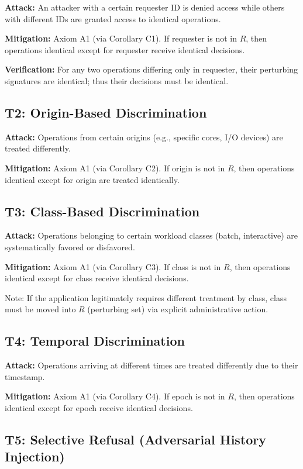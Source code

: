 \documentclass[11pt,oneside]{article}
\begin{document}
\textbf{Attack:} An attacker with a certain requester ID is denied access while others with different IDs are granted access to identical operations.

\textbf{Mitigation:} Axiom A1 (via Corollary C1). If requester is not in $R$, then operations identical except for requester receive identical decisions.

\textbf{Verification:} For any two operations differing only in requester, their perturbing signatures are identical; thus their decisions must be identical.

\subsection{T2: Origin-Based Discrimination}

\textbf{Attack:} Operations from certain origins (e.g., specific cores, I/O devices) are treated differently.

\textbf{Mitigation:} Axiom A1 (via Corollary C2). If origin is not in $R$, then operations identical except for origin are treated identically.

\subsection{T3: Class-Based Discrimination}

\textbf{Attack:} Operations belonging to certain workload classes (batch, interactive) are systematically favored or disfavored.

\textbf{Mitigation:} Axiom A1 (via Corollary C3). If class is not in $R$, then operations identical except for class receive identical decisions.

Note: If the application legitimately requires different treatment by class, class must be moved into $R$ (perturbing set) via explicit administrative action.

\subsection{T4: Temporal Discrimination}

\textbf{Attack:} Operations arriving at different times are treated differently due to their timestamp.

\textbf{Mitigation:} Axiom A1 (via Corollary C4). If epoch is not in $R$, then operations identical except for epoch receive identical decisions.

\subsection{T5: Selective Refusal (Adversarial History Injection)}
\end{document}

